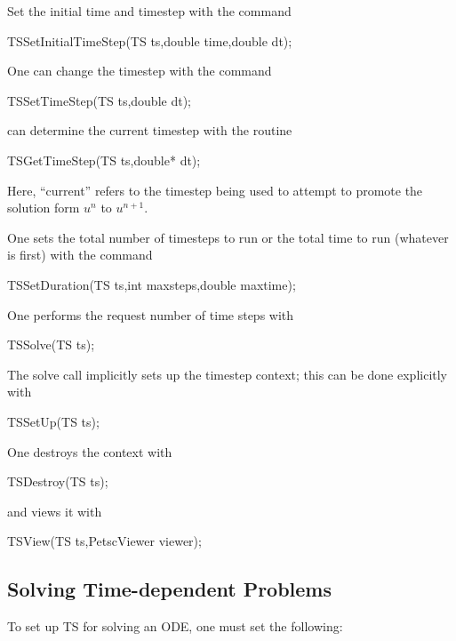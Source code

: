 Set the initial time and timestep with the command
\begin{tabbing}
 TSSetInitialTimeStep(TS ts,double time,double dt);
\end{tabbing}
One can change the timestep with the command
\begin{tabbing}
 TSSetTimeStep(TS ts,double dt);
\end{tabbing}
can determine the current timestep with the routine
\begin{tabbing}
 TSGetTimeStep(TS ts,double* dt);
\end{tabbing}
Here, ``current'' refers to the timestep being used to attempt to
promote the solution form $ u^n $ to $ u^{n+1}. $

One sets the total number of timesteps to run or the total time to run 
(whatever is first) with the command 
\begin{tabbing}
 TSSetDuration(TS ts,int maxsteps,double maxtime);
\end{tabbing}
One performs the request number of time steps with
\begin{tabbing}
  TSSolve(TS ts);
\end{tabbing}
The solve call implicitly sets up the timestep context;
this can be done explicitly with
\begin{tabbing}
 TSSetUp(TS ts);
\end{tabbing}
One destroys the context with
\begin{tabbing}
 TSDestroy(TS ts);
\end{tabbing}
and views it with 
\begin{tabbing}
 TSView(TS ts,PetscViewer viewer);
\end{tabbing}

\subsection{Solving Time-dependent Problems}
To set up TS for solving an ODE, one must set the following:

